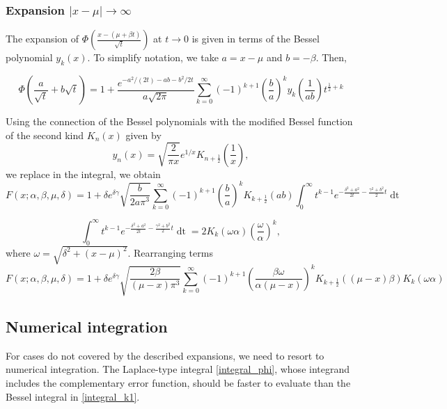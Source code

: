\documentclass[10pt,a4paper,oneside]{article}
\numberwithin{equation}{section}
\begin{document}
\subsubsection{Expansion $|x-\mu| \to \infty$}

The expansion of $\Phi\left(\frac{x-(\mu + \beta t)}{\sqrt{t}}\right)$ at $t\to 0$ is given in terms of the Bessel polynomial $y_k(x)$. To simplify notation, we take $a = x-\mu$ and $b=-\beta$. Then,

\begin{equation}
\Phi\left(\frac{a}{\sqrt{t}} + b\sqrt{t}\right) = 1 + \frac{e^{-a^2/(2t) -ab - b^2/2 t}}{a\sqrt{2\pi}}\sum_{k=0}^{\infty} (-1)^{k+1} \left(\frac{b}{a}\right)^k y_k\left(\frac{1}{ab}\right) t^{\frac{1}{2} + k}
\end{equation}

Using the connection of the Bessel polynomials with the modified Bessel function of the second kind $K_n(x)$ given by
\begin{equation}
y_n(x) = \sqrt{\frac{2}{\pi x}}e^{1/x} K_{n + \frac{1}{2}}\left(\frac{1}{x}\right),
\end{equation}
we replace in the integral, we obtain
\begin{equation}
F(x; \alpha, \beta, \mu, \delta) = 1 + \delta e^{\delta \gamma} \sqrt{\frac{b}{2a\pi^3}}\sum_{k=0}^{\infty} (-1)^{k+1} \left(\frac{b}{a}\right)^k K_{k + \frac{1}{2}}(ab)\int_0^{\infty}t^{k-1} e^{-\frac{\delta^2 + a^2}{2t} -\frac{\gamma^2 + b^2}{2}t} \mathop{dt}
\end{equation}

\begin{equation}
\int_0^{\infty}t^{k-1} e^{-\frac{\delta^2 + a^2}{2t} -\frac{\gamma^2 + b^2}{2}t} \mathop{dt} = 2 K_k(\omega \alpha) \left(\frac{\omega}{\alpha}\right)^k,
\end{equation}
where $\omega = \sqrt{\delta^2 + (x-\mu)^2}$. Rearranging terms
\begin{equation}
F(x; \alpha, \beta, \mu, \delta) = 1 + \delta e^{\delta \gamma} \sqrt{\frac{2\beta}{(\mu-x)\pi^3}}\sum_{k=0}^{\infty} (-1)^{k+1} \left(\frac{\beta \omega}{\alpha(\mu-x)}\right)^k K_{k + \frac{1}{2}}((\mu-x)\beta) K_k(\omega \alpha) 
\end{equation}


\subsection{Numerical integration}
For cases do not covered by the described expansions, we need to resort to numerical integration. The Laplace-type integral \eqref{integral_phi}, whose integrand includes the complementary error function, should be faster to evaluate than the Bessel integral in \eqref{integral_k1}.
\end{document}
